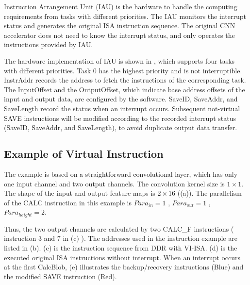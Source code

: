 Instruction Arrangement Unit (IAU) is the hardware to handle the computing requirements from tasks with different priorities. The IAU monitors the interrupt status and generates the original ISA instruction sequence. The original CNN accelerator does not need to know the interrupt status, and only operates the instructions provided by IAU.

The hardware implementation of IAU is shown in , which supports four tasks with different priorities. Task 0 has the highest priority and is not interruptible. 
InstrAddr records the address to fetch the instructions of the corresponding task. The InputOffset and the OutputOffset, which indicate base address offsets of the input and output data, are configured by the software. 
SaveID, SaveAddr, and SaveLength record the status when an interrupt occurs. 
Subsequent not-virtual SAVE instructions will be modified according to the recorded interrupt status (SaveID, SaveAddr, and SaveLength), to avoid duplicate output data transfer.


\subsection{Example of Virtual Instruction}
\label{sec:exampleVirtual}


The example is based on a straightforward convolutional layer, which has only one input channel and two output channels. 
The convolution kernel size is $1 \times 1$. The shape of the input and output feature-maps is $ 2 \times 16 $ ((a)). The parallelism of the CALC instruction in this example is $ Para_{in} = 1$ , $ Para_{out}=1$ , $Para_{height}=2$.

Thus, the two output channels are calculated by two CALC\_F instructions ( instruction 3 and 7 in (c) ). The addresses used in the instruction example are listed in (b). (c) is the instruction sequence from DDR with VI-ISA. (d) is the executed original ISA instructions without interrupt. When an interrupt occurs at the first CalcBlob, (e) illustrates the backup/recovery instructions (Blue) and the modified SAVE instruction (Red). 

